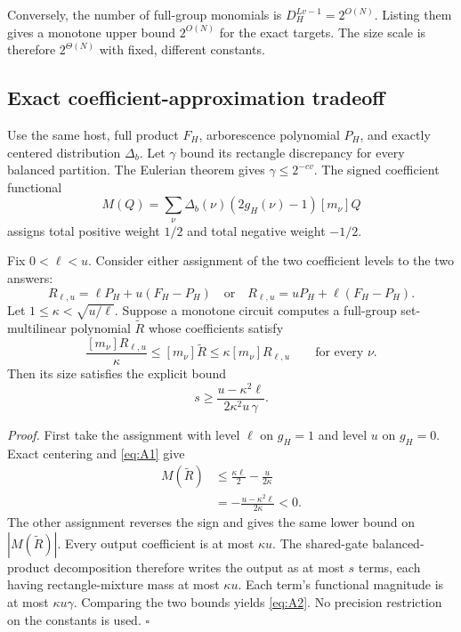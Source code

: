 \documentclass[11pt]{article}
\theoremstyle{definition}
\theoremstyle{remark}
\numberwithin{equation}{section}
\begin{document}
Conversely, the number of full-group monomials is
\(D_H^{Lv-1}=2^{O(N)}\). Listing them gives a monotone upper
bound \(2^{O(N)}\) for the exact targets. The size scale is
therefore \(2^{\Theta(N)}\) with fixed, different constants.
\subsection{Exact coefficient-approximation tradeoff}

Use the same host, full product \(F_H\), arborescence polynomial
\(P_H\), and exactly centered distribution \(\Delta_b\).
Let \(\gamma\) bound its rectangle discrepancy for every balanced
partition. The Eulerian theorem gives \(\gamma\le2^{-cv}\).
The signed coefficient functional
\[
 M(Q)=\sum_\nu\Delta_b(\nu)(2g_H(\nu)-1)[m_\nu]Q
\]
assigns total positive weight \(1/2\) and total negative weight
\(-1/2\).

Fix \(0<\ell<u\). Consider either assignment of the two
coefficient levels to the two answers:
\[
 R_{\ell,u}=\ell P_H+u(F_H-P_H)
 \quad\text{or}\quad
 R_{\ell,u}=uP_H+\ell(F_H-P_H).
\]
Let \(1\le\kappa<\sqrt{u/\ell}\). Suppose a monotone circuit
computes a full-group set-multilinear polynomial \(\widetilde R\)
whose coefficients satisfy
\begin{equation}\label{eq:A1}
\frac{[m_\nu]R_{\ell,u}}{\kappa}
       \le [m_\nu]\widetilde R
       \le \kappa[m_\nu]R_{\ell,u}
                          \qquad\text{for every }\nu.
\end{equation}
Then its size satisfies the explicit bound
\begin{equation}\label{eq:A2}
\boxed{\quad
    s\ge\frac{u-\kappa^2\ell}{2\kappa^2u\,\gamma}.
       \quad}
\end{equation}

\emph{Proof.} First take the assignment with level \(\ell\) on
\(g_H=1\) and level \(u\) on \(g_H=0\). Exact centering and
\eqref{eq:A1} give
\[
 \begin{aligned}
 M(\widetilde R)
 &\le \frac{\kappa\ell}{2}-\frac{u}{2\kappa}\\
 &=-\frac{u-\kappa^2\ell}{2\kappa}<0.
 \end{aligned}
\]
The other assignment reverses the sign and gives the same
lower bound on \(|M(\widetilde R)|\).
Every output coefficient is at most \(\kappa u\).
The shared-gate balanced-product decomposition therefore writes
the output as at most \(s\) terms, each having rectangle-mixture
mass at most \(\kappa u\). Each term's functional magnitude is
at most \(\kappa u\gamma\). Comparing the two bounds yields
\eqref{eq:A2}. No precision restriction on the constants is used. \(\square\)
\end{document}
